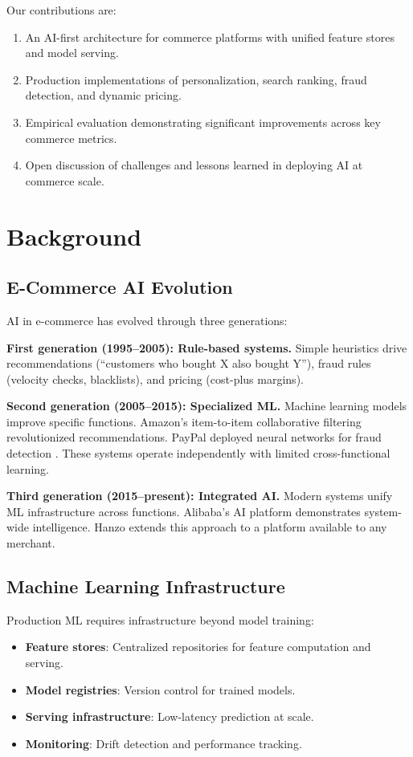 \documentclass[11pt,twocolumn]{article}
\begin{document}
Our contributions are:
\begin{enumerate}
\item An AI-first architecture for commerce platforms with unified feature stores and model serving.
\item Production implementations of personalization, search ranking, fraud detection, and dynamic pricing.
\item Empirical evaluation demonstrating significant improvements across key commerce metrics.
\item Open discussion of challenges and lessons learned in deploying AI at commerce scale.
\end{enumerate}

\section{Background}

\subsection{E-Commerce AI Evolution}

AI in e-commerce has evolved through three generations:

\textbf{First generation (1995--2005): Rule-based systems.} Simple heuristics drive recommendations (``customers who bought X also bought Y''), fraud rules (velocity checks, blacklists), and pricing (cost-plus margins).

\textbf{Second generation (2005--2015): Specialized ML.} Machine learning models improve specific functions. Amazon's item-to-item collaborative filtering \cite{linden2003} revolutionized recommendations. PayPal deployed neural networks for fraud detection \cite{paypal2013}. These systems operate independently with limited cross-functional learning.

\textbf{Third generation (2015--present): Integrated AI.} Modern systems unify ML infrastructure across functions. Alibaba's AI platform \cite{alibaba2017} demonstrates system-wide intelligence. Hanzo extends this approach to a platform available to any merchant.

\subsection{Machine Learning Infrastructure}

Production ML requires infrastructure beyond model training:

\begin{itemize}
\item \textbf{Feature stores}: Centralized repositories for feature computation and serving.
\item \textbf{Model registries}: Version control for trained models.
\item \textbf{Serving infrastructure}: Low-latency prediction at scale.
\item \textbf{Monitoring}: Drift detection and performance tracking.
\end{itemize}
\end{document}
